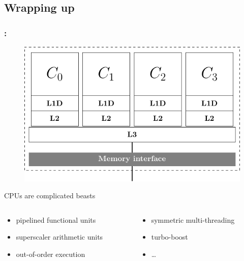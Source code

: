 \documentclass[9pt,xcolor=table]{beamer}
\begin{document}
\subsection{Wrapping up}
\begin{frame}
\frametitle{\insertsectionhead{}: \insertsubsection{}}
\begin{figure}[htb]
  \includegraphics[height=0.55\textheight]{tikz/cpu_schematic}
\end{figure}
\begin{block}{CPUs are complicated beasts}
  \begin{columns}[t]
    \begin{column}{.48\textwidth}
      \begin{itemize}
      \item pipelined functional units
      \item superscaler arithmetic units
      \item out-of-order execution
      \end{itemize}
    \end{column}
    \begin{column}{.48\textwidth}
      \begin{itemize}
      \item symmetric multi-threading
      \item turbo-boost
      \item \dots
      \end{itemize}
    \end{column}
  \end{columns}
\end{block}

\end{frame}
\end{document}
